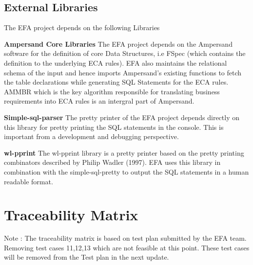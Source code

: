 \documentclass[12pt, svgnames]{article}
\begin{document}
{{{{{{{{\subsection{External Libraries}
The EFA project depends on the following Libraries 
\begin{description}
	\item \textbf{Ampersand Core Libraries} \newline
		The EFA project depends on the Ampersand software for the definition of core Data Structures, i.e FSpec (which contains the definition to the underlying ECA rules). EFA also maintains the relational schema of the input and hence imports Ampersand's existing functions to fetch the table declarations while generating SQL Statements for the ECA rules. AMMBR \cite{AMMBR} which is the key algorithm responsible for translating business requirements into ECA rules is an intergral part of Ampersand.
	\item \textbf{Simple-sql-parser} \newline
		The pretty printer of the EFA project depends directly on this library for pretty printing the SQL statements in the console. This is important from a development and debugging perspective.\cite{simple-sql}
	\item \textbf{wl-pprint} \newline
		The wl-pprint library\cite{wl-pprint} is a pretty printer based on the pretty printing combinators described by Philip Wadler (1997). EFA uses this library in combination with the simple-sql-pretty to output the SQL statements in a human readable format.
	\item 
\end{description}

\section{Traceability Matrix} \label{SecTM}

Note : The traceability matrix is based on test plan submitted by the EFA team. Removing test cases 11,12,13 which are not feasible at this point. These test cases will be removed from the Test plan in the next update.

}}}}}}}}
\end{document}
